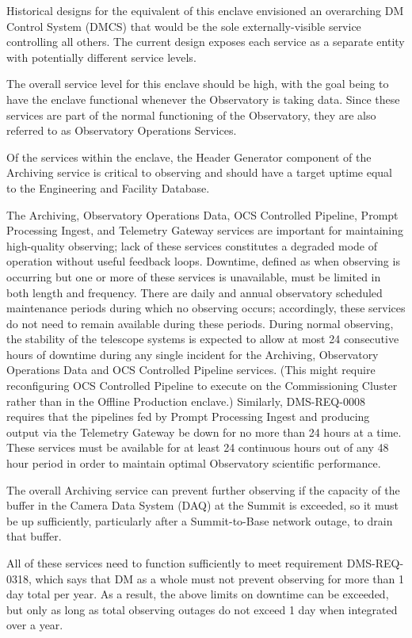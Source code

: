 \documentclass[DM,toc,lsstdraft]{lsstdoc}
\begin{document}
Historical designs for the equivalent of this enclave envisioned an overarching DM Control System (DMCS) that would be the sole externally-visible service controlling all others.
The current design exposes each service as a separate entity with potentially different service levels.

The overall service level for this enclave should be high, with the goal being to have the enclave functional whenever the Observatory is taking data.
Since these services are part of the normal functioning of the Observatory, they are also referred to as Observatory Operations Services.

Of the services within the enclave, the Header Generator component of the Archiving service is critical to observing and should have a target uptime equal to the Engineering and Facility Database.

The Archiving, Observatory Operations Data, OCS Controlled Pipeline, Prompt Processing Ingest, and Telemetry Gateway services are important for maintaining high-quality observing; lack of these services constitutes a degraded mode of operation without useful feedback loops.
Downtime, defined as when observing is occurring but one or more of these services is unavailable, must be limited in both length and frequency.
There are daily and annual observatory scheduled maintenance periods during which no observing occurs; accordingly, these services do not need to remain available during these periods.
During normal observing, the stability of the telescope systems is expected to allow at most 24 consecutive hours of downtime during any single incident for the Archiving, Observatory Operations Data and OCS Controlled Pipeline services.
(This might require reconfiguring OCS Controlled Pipeline to execute on the Commissioning Cluster rather than in the Offline Production enclave.)
Similarly, DMS-REQ-0008 requires that the pipelines fed by Prompt Processing Ingest and producing output via the Telemetry Gateway be down for no more than 24 hours at a time.
These services must be available for at least 24 continuous hours out of any 48 hour period in order to maintain optimal Observatory scientific performance.

The overall Archiving service can prevent further observing if the capacity of the buffer in the Camera Data System (DAQ) at the Summit is exceeded, so it must be up sufficiently, particularly after a Summit-to-Base network outage, to drain that buffer.

All of these services need to function sufficiently to meet requirement DMS-REQ-0318, which says that DM as a whole must not prevent observing for more than 1 day total per year.
As a result, the above limits on downtime can be exceeded, but only as long as total observing outages do not exceed 1 day when integrated over a year.
\end{document}
